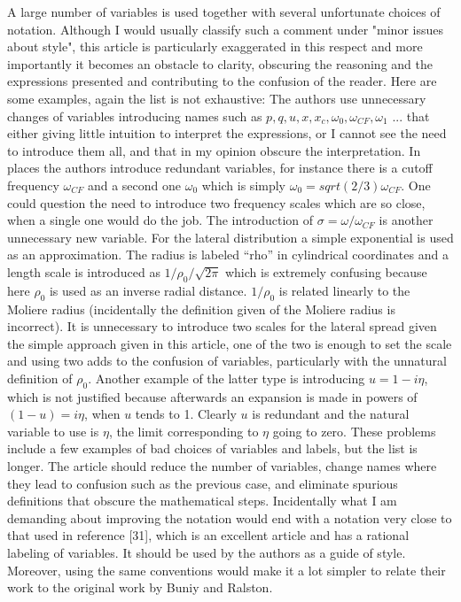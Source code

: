 \documentclass[12pt]{article}
\begin{document}
A large number of variables is used together with several unfortunate choices of notation. Although I would usually classify such a comment under "minor issues about style", this article is particularly
exaggerated in this respect and more importantly it becomes an obstacle to clarity, obscuring the reasoning and the expressions presented and contributing to the confusion of the reader. Here are
some examples, again the list is not exhaustive: The authors use unnecessary changes of variables introducing names such as $p,q,u, x, x_{c}, \omega_{0}, \omega_{CF}, \omega_1$ ... that either giving little intuition to interpret the expressions, or I cannot see the need to introduce them all, and that in my opinion obscure the interpretation. In places the authors introduce redundant variables, for instance
there is a cutoff frequency $\omega_{CF}$ and a second one $\omega_0$ which is simply $\omega_0=sqrt(2/3) \omega_{CF}$. One could question the need to introduce two frequency scales which are so close, when a single one would do the job. The introduction of $\sigma = \omega/\omega_{CF}$ is another unnecessary new variable. For the lateral distribution a simple exponential is used as an approximation. The radius is labeled ``rho'' in cylindrical coordinates and a length scale is introduced as $1/\rho_0/\sqrt{2 \pi}$ which is extremely confusing because here $\rho_0$ is used as an inverse radial distance. $1/
\rho_0$ is related linearly to the Moliere radius (incidentally the definition given of the Moliere radius is incorrect). It is unnecessary to introduce two scales for the lateral spread given the simple approach given in this article, one of the two is enough to set the scale and using two adds to the confusion of variables, particularly with the unnatural definition of $\rho_0$. Another example of the latter type is introducing $u=1-i \eta$, which is not justified because afterwards an expansion is made in powers of $(1-u)=i \eta$, when $u$ tends to 1. Clearly $u$ is redundant and the natural variable to use is $\eta$, the limit corresponding to $\eta$ going to zero.  These problems include a few examples of bad choices of variables and labels, but the list is longer. The article should reduce the number of variables, change names where they lead to confusion such as the previous case, and eliminate spurious definitions that obscure the mathematical steps. Incidentally what I am demanding about improving the notation would end with a notation very close to that used in reference [31], which is an excellent article and has a rational labeling of variables. It should be used by the authors as a guide of style. Moreover, using the same conventions would make it a lot simpler to relate their work to the original work by Buniy and Ralston. 
\end{document}
